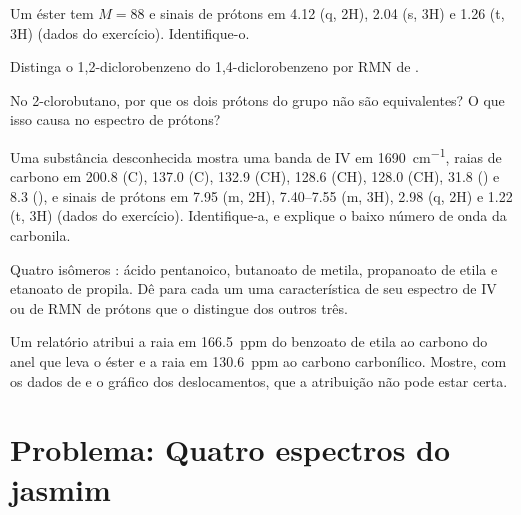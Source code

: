 \begin{exercise}[$\star\star$]\label{exo:b2:structure-determination:7}
Um éster tem $M = 88$ e sinais de prótons em 4.12 (q, 2H), 2.04 (s, 3H) e 1.26 (t, 3H) (dados do
exercício). Identifique-o.
\end{exercise}

\begin{exercise}[$\star\star$]\label{exo:b2:structure-determination:8}
Distinga o 1,2-diclorobenzeno do 1,4-diclorobenzeno por RMN de .
\end{exercise}

\begin{exercise}[$\star\star$]\label{exo:b2:structure-determination:9}
No 2-clorobutano, por que os dois prótons do grupo  não são equivalentes? O que isso causa no
espectro de prótons?
\end{exercise}

\begin{exercise}[$\star\star\star$]\label{exo:b2:structure-determination:10}
Uma substância desconhecida  mostra uma banda de IV em \qty{1690}{cm^{-1}}, raias de carbono em
200.8 (C), 137.0 (C), 132.9 (CH), 128.6 (CH), 128.0 (CH), 31.8 () e 8.3 (), e sinais de
prótons em 7.95 (m, 2H), 7.40--7.55 (m, 3H), 2.98 (q, 2H) e 1.22 (t, 3H) (dados do exercício).
Identifique-a, e explique o baixo número de onda da carbonila.
\end{exercise}

\begin{exercise}[$\star\star\star$]\label{exo:b2:structure-determination:11}
Quatro isômeros : ácido pentanoico, butanoato de metila, propanoato de etila e etanoato de
propila. Dê para cada um uma característica de seu espectro de IV ou de RMN de prótons que o distingue
dos outros três.
\end{exercise}

\begin{exercise}[$\star\star\star$]\label{exo:b2:structure-determination:12}
Um relatório atribui a raia em 166.5~ppm do benzoato de etila ao carbono do anel que leva o éster e a
raia em 130.6~ppm ao carbono carbonílico. Mostre, com os dados de  e o gráfico dos deslocamentos,
que a atribuição não pode estar certa.
\end{exercise}

\section{Problema: Quatro espectros do jasmim}

